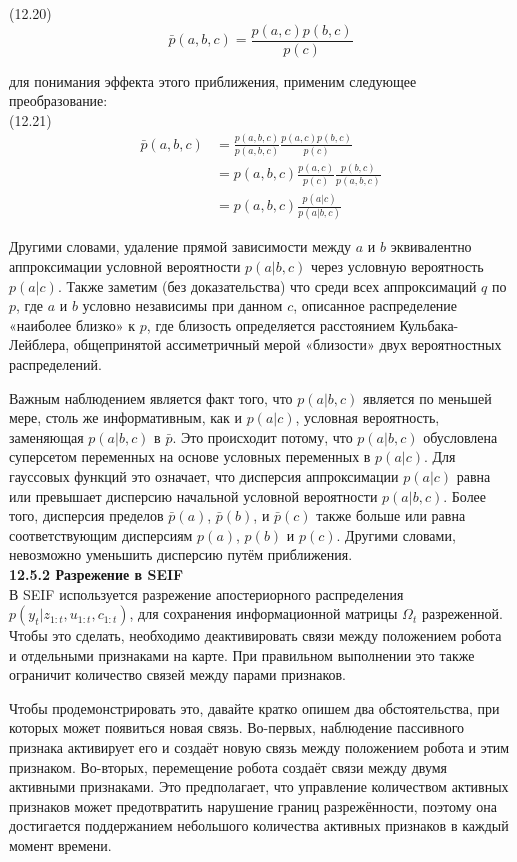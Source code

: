 \documentclass[10pt,a4paper]{article}
\begin{document}
(12.20)
$$\bar{p}(a,b,c)=\frac{p(a,c)p(b,c)}{p(c)}$$

для понимания эффекта этого приближения, применим следующее преобразование:\\

(12.21)
\begin{equation*}
\begin{split}
\bar{p}(a,b,c)&=\frac{p(a,b,c)}{p(a,b,c)}\frac{p(a,c)p(b,c)}{p(c)}\\
&=p(a,b,c)\frac{p(a,c)}{p(c)}\frac{p(b,c)}{p(a,b,c)}\\
&=p(a,b,c)\frac{p(a|c)}{p(a|b,c)}
\end{split}
\end{equation*}

Другими словами, удаление прямой зависимости между $a$ и $b$ эквивалентно аппроксимации условной вероятности $p(a|b, c)$ через условную вероятность $p(a|c)$. Также заметим (без доказательства) что среди всех аппроксимаций $q$ по $p$, где $a$ и $b$ условно независимы при данном $c$, описанное распределение «наиболее близко» к $p$, где близость определяется расстоянием Кульбака-Лейблера, общепринятой ассиметричный мерой «близости» двух вероятностных распределений.

Важным наблюдением является факт того, что $p(a | b, c)$ является по меньшей мере, столь же информативным, как и $p(a | c)$, условная вероятность, заменяющая $p(a | b, c)$ в $\bar{p}$. Это происходит потому, что $p(a | b, c)$ обусловлена суперсетом переменных на основе условных переменных в $p(a | c)$. Для гауссовых функций это означает, что дисперсия аппроксимации $p(a | c)$ равна или превышает дисперсию начальной условной вероятности $p(a | b, c)$.  Более того, дисперсия пределов $\bar{p}(a)$, $\bar{p}(b)$, и $\bar{p}(c)$ также больше или равна соответствующим дисперсиям $p(a)$, $p(b)$ и $p(c)$. Другими словами, невозможно уменьшить дисперсию путём приближения.\\

\textbf{12.5.2	Разрежение в SEIF}\\

В SEIF используется разрежение апостериорного распределения $p(y_t|z_{1:t}, u_{1:t}, c_{1:t})$, для сохранения информационной матрицы $\varOmega_t$ разреженной. Чтобы это сделать, необходимо деактивировать связи между положением робота и отдельными признаками на карте. При правильном выполнении это также ограничит количество связей между парами признаков.

Чтобы продемонстрировать это, давайте кратко опишем два обстоятельства, при которых может появиться новая связь. Во-первых, наблюдение пассивного признака активирует его и создаёт новую связь между положением робота и этим признаком. Во-вторых, перемещение робота создаёт связи между двумя активными признаками. Это предполагает, что управление количеством активных признаков может предотвратить нарушение границ разрежённости, поэтому она достигается поддержанием небольшого количества активных признаков в каждый момент времени.
\end{document}
